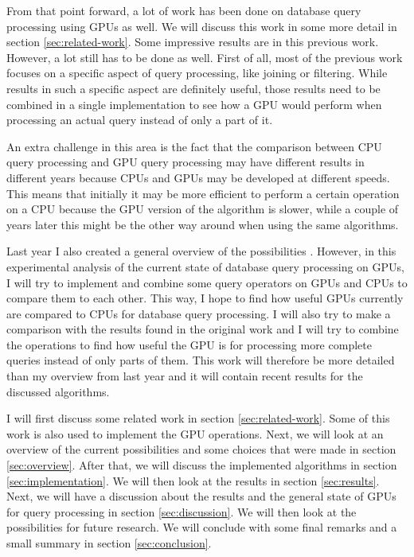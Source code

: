\documentclass[a4paper,titlepage]{article}
\begin{document}
From that point forward, a lot of work has been done on database query processing using GPUs as well. We will discuss this work in some more detail in section \ref{sec:related-work}. Some impressive results are in this previous work. However, a lot still has to be done as well. First of all, most of the previous work focuses on a specific aspect of query processing, like joining or filtering. While results in such a specific aspect are definitely useful, those results need to be combined in a single implementation to see how a GPU would perform when processing an actual query instead of only a part of it.

An extra challenge in this area is the fact that the comparison between CPU query processing and GPU query processing may have different results in different years because CPUs and GPUs may be developed at different speeds. This means that initially it may be more efficient to perform a certain operation on a CPU because the GPU version of the algorithm is slower, while a couple of years later this might be the other way around when using the same algorithms.

Last year I also created a general overview of the possibilities \cite{kostjens2015}. However, in this experimental analysis of the current state of database query processing on GPUs, I will try to implement and combine some query operators on GPUs and CPUs to compare them to each other. This way, I hope to find how useful GPUs currently are compared to CPUs for database query processing. I will also try to make a comparison with the results found in the original work and I will try to combine the operations to find how useful the GPU is for processing more complete queries instead of only parts of them. This work will therefore be more detailed than my overview from last year and it will contain recent results for the discussed algorithms.

I will first discuss some related work in section \ref{sec:related-work}. Some of this work is also used to implement the GPU operations. Next, we will look at an overview of the current possibilities and some choices that were made in section \ref{sec:overview}. After that, we will discuss the implemented algorithms in section \ref{sec:implementation}. We will then look at the results in section \ref{sec:results}. Next, we will have a discussion about the results and the general state of GPUs for query processing in section \ref{sec:discussion}. We will then look at the possibilities for future research. We will conclude with some final remarks and a small summary in section \ref{sec:conclusion}.
\end{document}
